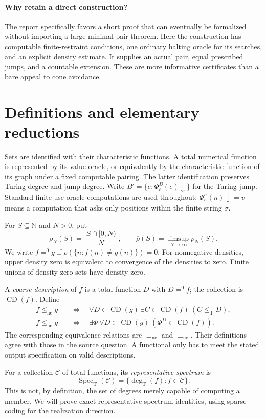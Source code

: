 \documentclass[11pt,a4paper]{article}
\newcommand{\N}{\mathbb N}
\newcommand{\leT}{\leq_{\mathrm T}}
\newcommand{\leuc}{\leq_{\mathrm{uc}}}
\newcommand{\lenc}{\leq_{\mathrm{nc}}}
\newcommand{\equc}{\equiv_{\mathrm{uc}}}
\newcommand{\eqnc}{\equiv_{\mathrm{nc}}}
\newcommand{\az}{\mathrel{=^{0}}}
\newcommand{\CD}{\operatorname{CD}}
\newcommand{\Spec}{\operatorname{Spec}_{\mathrm T}}
\newcommand{\degT}{\operatorname{deg}_{\mathrm T}}
\theoremstyle{definition}\newtheorem{definition}[theorem]{Definition}
\theoremstyle{remark}\newtheorem{remark}[theorem]{Remark}
\begin{document}
\paragraph{Why retain a direct construction?}
The report specifically favors a short proof that can eventually be formalized without importing a large minimal-pair theorem. Here the construction has computable finite-restraint conditions, one ordinary halting oracle for its searches, and an explicit density estimate. It supplies an actual pair, equal prescribed jumps, and a countable extension. These are more informative certificates than a bare appeal to cone avoidance.

\section{Definitions and elementary reductions}
\label{sec:definitions}
Sets are identified with their characteristic functions. A total numerical function is represented by its value oracle, or equivalently by the characteristic function of its graph under a fixed computable pairing. The latter identification preserves Turing degree and jump degree. Write $B'=\{e:\Phi_e^B(e)\downarrow\}$ for the Turing jump. Standard finite-use oracle computations are used throughout: $\Phi_e^\sigma(n)\downarrow=v$ means a computation that asks only positions within the finite string $\sigma$.

For $S\subseteq\N$ and $N>0$, put
\[
 \rho_N(S)=\frac{|S\cap[0,N)|}{N},\qquad
 \overline\rho(S)=\limsup_{N\to\infty}\rho_N(S).
\]
We write $f\az g$ if $\overline\rho(\{n:f(n)\ne g(n)\})=0$. For nonnegative densities, upper density zero is equivalent to convergence of the densities to zero. Finite unions of density-zero sets have density zero.

A \emph{coarse description} of $f$ is a total function $D$ with $D\az f$; the collection is $\CD(f)$. Define
\begin{align*}
 f\lenc g
 &\quad\Longleftrightarrow\quad
 \forall D\in\CD(g)\ \exists C\in\CD(f)\ (C\leT D),\\
 f\leuc g
 &\quad\Longleftrightarrow\quad
 \exists\Phi\ \forall D\in\CD(g)\ (\Phi^D\in\CD(f)).
\end{align*}
The corresponding equivalence relations are $\eqnc$ and $\equc$. Their definitions agree with those in the source question.\cite{Gerdes} A functional only has to meet the stated output specification on valid descriptions.

For a collection $\mathcal C$ of total functions, its \emph{representative spectrum} is
\[
 \Spec(\mathcal C)=\{\degT(f):f\in\mathcal C\}.
\]
This is not, by definition, the set of degrees merely capable of computing a member. We will prove exact representative-spectrum identities, using sparse coding for the realization direction.
\end{document}
